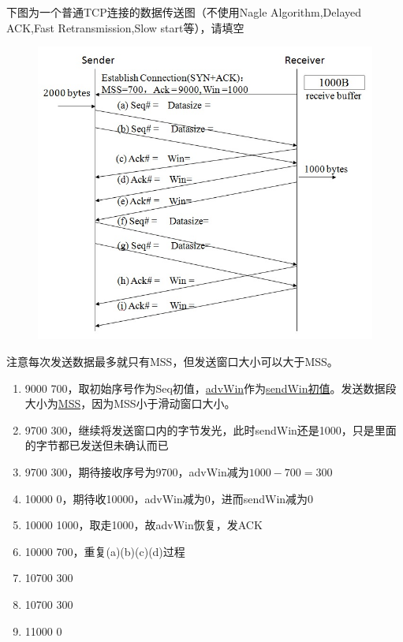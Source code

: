 \begin{example}
    下图为一个普通TCP连接的数据传送图（不使用Nagle Algorithm,Delayed ACK,Fast Retransmission,Slow start等），请填空
    \begin{figure}[H]
        \centering
        \includegraphics[width=0.5\linewidth]{fig/tcp_example.jpg}
    \end{figure}
\end{example}
\begin{analysis}
    注意每次发送数据最多就只有MSS，但发送窗口大小可以大于MSS。
    \begin{enumerate}[label=(\alph*)]
        \item 9000 700，取初始序号作为Seq初值，\underline{advWin}作为\underline{sendWin初值}。发送数据段大小为\underline{MSS}，因为MSS小于滑动窗口大小。
        \item 9700 300，继续将发送窗口内的字节发光，此时sendWin还是1000，只是里面的字节都已发送但未确认而已
        \item 9700 300，期待接收序号为9700，advWin减为$1000-700=300$
        \item 10000 0，期待收10000，advWin减为0，进而sendWin减为0
        \item 10000 1000，取走1000，故advWin恢复，发ACK
        \item 10000 700，重复(a)(b)(c)(d)过程
        \item 10700 300
        \item 10700 300
        \item 11000 0
    \end{enumerate}
\end{analysis}

